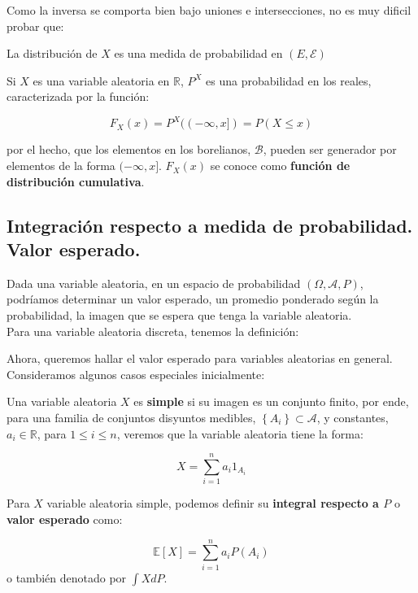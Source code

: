 	Como la inversa se comporta bien bajo uniones e intersecciones, no es muy dificil probar que:

\begin{theorem}
	La distribución de $X$ es una medida de probabilidad en $(E, \mathcal{E})$
\end{theorem}

	Si $X$ es una variable aleatoria en $\mathbb{R}$, $P^{X}$ es una probabilidad en los reales, caracterizada por la función:

	\[
		F_X (x) = P^{X} ( (-\infty, x] ) = P(X \leq x)
	\]

	por el hecho, que los elementos en los borelianos, $\mathcal{B}$, pueden ser generador por elementos de la forma $(-\infty, x]$. $F_X (x)$ se conoce como \textbf{función de distribución cumulativa}.





\subsection{Integración respecto a medida de probabilidad. Valor esperado.}

Dada una variable aleatoria, en un espacio de probabilidad $(\Omega, \mathcal{A}, P)$, podríamos determinar un valor esperado, un promedio ponderado según la probabilidad, la imagen que se espera que tenga la variable aleatoria. \\

Para una variable aleatoria discreta, tenemos la definición:


Ahora, queremos hallar el valor esperado para variables aleatorias en general. Consideramos algunos casos especiales inicialmente:

\begin{boxDef}
	Una variable aleatoria $X$ es \textbf{simple} si su imagen es un conjunto finito, por ende, para una familia de conjuntos disyuntos medibles, $ \left\{ A_i  \right\} \subset \mathcal{A}$, y constantes, $a_i \in \mathbb{R}$, para $1 \leq i \leq n$, veremos que la variable aleatoria tiene la forma:

	\[
		X = \sum_{i = 1}^n a_i 1_{A_i}
	\]

	Para $X$ variable aleatoria simple, podemos definir su \textbf{integral respecto a $P$} o \textbf{valor esperado} como:

	\[
		\mathbb{E}[X] = \sum_{i = 1}^n a_i P(A_i)
	\]
	o también denotado por $\int X dP$.

\end{boxDef}

